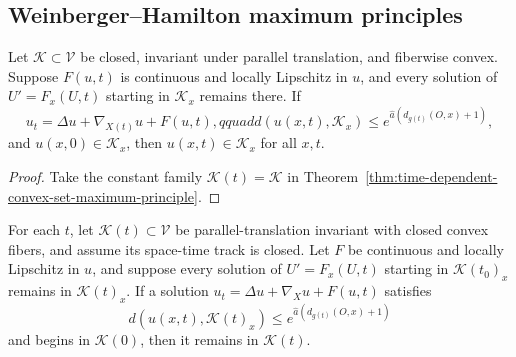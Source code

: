 \subsection{Weinberger--Hamilton maximum principles}

\begin{theorem}
\label{thm:weinberger-hamilton-noncompact-systems}

Let $\mathcal K\subset\mathcal V$ be closed, invariant under parallel
translation, and fiberwise convex.  Suppose $F(u,t)$ is continuous and locally
Lipschitz in $u$, and every solution of $U'=F_x(U,t)$ starting in
$\mathcal K_x$ remains there.  If
\[
u_t=\Delta u+\nabla_{X(t)}u+F(u,t),qquad
d(u(x,t),\mathcal K_x)\leq e^{\widehat a(d_{g(t)}(O,x)+1)},
\]
and $u(x,0)\in\mathcal K_x$, then $u(x,t)\in\mathcal K_x$ for all $x,t$.
\end{theorem}

\begin{proof}
\sketch
{}
Take the constant family $\mathcal K(t)=\mathcal K$ in
Theorem~\ref{thm:time-dependent-convex-set-maximum-principle}.
\end{proof}

\begin{theorem}
\label{thm:time-dependent-convex-set-maximum-principle}

For each $t$, let $\mathcal K(t)\subset\mathcal V$ be parallel-translation
invariant with closed convex fibers, and assume its space-time track is
closed.  Let $F$ be continuous and locally Lipschitz in $u$, and suppose every
solution of $U'=F_x(U,t)$ starting in $\mathcal K(t_0)_x$ remains in
$\mathcal K(t)_x$.  If a solution
$u_t=\Delta u+\nabla_Xu+F(u,t)$ satisfies
\[
d(u(x,t),\mathcal K(t)_x)\leq
e^{\widehat a(d_{g(t)}(O,x)+1)}
\]
and begins in $\mathcal K(0)$, then it remains in $\mathcal K(t)$.
\end{theorem}

